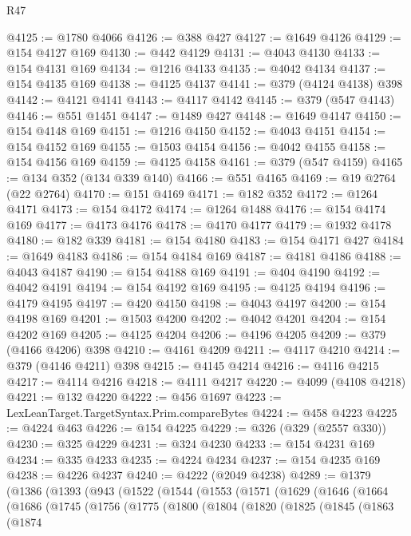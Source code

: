 \begin{lexlean}{R47}
\begin{coremodule}
@4125 := @1780 @4066
@4126 := @388 @427
@4127 := @1649 @4126
@4129 := @154 @4127 @169
@4130 := @442 @4129
@4131 := @4043 @4130
@4133 := @154 @4131 @169
@4134 := @1216 @4133
@4135 := @4042 @4134
@4137 := @154 @4135 @169
@4138 := @4125 @4137
@4141 := @379 (@4124 @4138) @398
@4142 := @4121 @4141
@4143 := @4117 @4142
@4145 := @379 (@547 @4143)
@4146 := @551 @1451
@4147 := @1489 @427
@4148 := @1649 @4147
@4150 := @154 @4148 @169
@4151 := @1216 @4150
@4152 := @4043 @4151
@4154 := @154 @4152 @169
@4155 := @1503 @4154
@4156 := @4042 @4155
@4158 := @154 @4156 @169
@4159 := @4125 @4158
@4161 := @379 (@547 @4159)
@4165 := @134 @352 (@134 @339 @140)
@4166 := @551 @4165
@4169 := @19 @2764 (@22 @2764)
@4170 := @151 @4169
@4171 := @182 @352
@4172 := @1264 @4171
@4173 := @154 @4172
@4174 := @1264 @1488
@4176 := @154 @4174 @169
@4177 := @4173 @4176
@4178 := @4170 @4177
@4179 := @1932 @4178
@4180 := @182 @339
@4181 := @154 @4180
@4183 := @154 @4171 @427
@4184 := @1649 @4183
@4186 := @154 @4184 @169
@4187 := @4181 @4186
@4188 := @4043 @4187
@4190 := @154 @4188 @169
@4191 := @404 @4190
@4192 := @4042 @4191
@4194 := @154 @4192 @169
@4195 := @4125 @4194
@4196 := @4179 @4195
@4197 := @420 @4150
@4198 := @4043 @4197
@4200 := @154 @4198 @169
@4201 := @1503 @4200
@4202 := @4042 @4201
@4204 := @154 @4202 @169
@4205 := @4125 @4204
@4206 := @4196 @4205
@4209 := @379 (@4166 @4206) @398
@4210 := @4161 @4209
@4211 := @4117 @4210
@4214 := @379 (@4146 @4211) @398
@4215 := @4145 @4214
@4216 := @4116 @4215
@4217 := @4114 @4216
@4218 := @4111 @4217
@4220 := @4099 (@4108 @4218)
@4221 := @132 @4220
@4222 := @456 @1697
@4223 := LexLeanTarget.TargetSyntax.Prim.compareBytes
@4224 := @458 @4223
@4225 := @4224 @463
@4226 := @154 @4225
@4229 := @326 (@329 (@2557 @330))
@4230 := @325 @4229
@4231 := @324 @4230
@4233 := @154 @4231 @169
@4234 := @335 @4233
@4235 := @4224 @4234
@4237 := @154 @4235 @169
@4238 := @4226 @4237
@4240 := @4222 (@2049 @4238)
@4289 := @1379
    (@1386
      (@1393
        (@943
          (@1522
            (@1544
              (@1553
                (@1571
                  (@1629
                    (@1646
                      (@1664
                        (@1686
                          (@1745
                            (@1756
                              (@1775
                                (@1800
                                  (@1804
                                    (@1820
                                      (@1825
                                        (@1845
                                          (@1863
                                            (@1874

\end{coremodule}
\end{lexlean}

